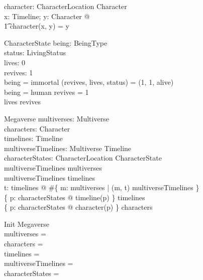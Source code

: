 \documentclass{article}
\begin{document}
\begin{axdef}
character: CharacterLocation \fun Character \\
\where
\forall x: Timeline; y: Character @ \\
\t1 character(x, y) = y \\
\end{axdef} 

\begin{schema}{CharacterState}
being: BeingType \\
status: LivingStatus \\
lives: 0   \\ 
revives: 1  \\ 
\where
being = immortal \implies (revives, lives, status) = (1, 1, alive) \\
being = human \implies revives = 1 \\
lives \leq revives \\
\end{schema}

\begin{schema}{Megaverse}
multiverses: \power Multiverse \\
characters: \power Character \\
timelines: \power Timeline \\ 
multiverseTimelines: Multiverse \rel Timeline \\
characterStates: CharacterLocation \pfun CharacterState \\
\where
\dom multiverseTimelines \subseteq multiverses \\ 
\ran multiverseTimelines \subseteq timelines \\ 
\forall t: timelines @ \#\{ m: multiverses | (m, t) \in multiverseTimelines \}  \\
\{ p: \dom characterStates @ timeline(p) \} \subseteq timelines \\
\{ p: \dom characterStates @ character(p) \} \subseteq characters \\
\end{schema}

\begin{schema}{Init}
Megaverse \\ 
\where
multiverses = \emptyset \\
characters = \emptyset \\ 
timelines = \emptyset \\
multiverseTimelines = \emptyset \\
characterStates = \emptyset \\
\end{schema}
\end{document}
